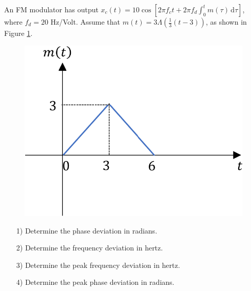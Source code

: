 \documentclass{assignment}
\begin{document}
\begin{prob}
    An FM modulator has output $x_c(t)=10\cos[2\pi f_ct+2\pi f_d\int_0^tm(\tau)\,\mathrm{d}\tau]$, where $f_d=20$ Hz/Volt. Assume that $m(t)=3\Lambda\left(\frac{1}{3}(t-3)\right)$, as shown in Figure \ref{A-5-P-1}.
    \begin{figure}[h]
        \centering
        \includegraphics[width=.5\columnwidth]{Assignment-5-Problem-1.png}
        \caption{}
        \label{A-5-P-1}
    \end{figure}
    \begin{itemize}
        \item[1)] Determine the phase deviation in radians.
        \item[2)] Determine the frequency deviation in hertz.
        \item[3)] Determine the peak frequency deviation in hertz.
        \item[4)] Determine the peak phase deviation in radians.
    \end{itemize}
\end{prob}
\end{document}

